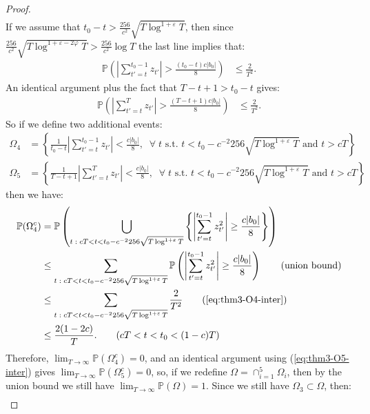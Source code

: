 \documentclass{article}
\newcommand{\sforall}{\;\forall\;}
\begin{document}
\begin{proof}
\begin{align*}
\end{align*}
If we assume that $t_0-t > \frac{256}{c^2}\sqrt{T\log^{1+\varepsilon}T}$, then since $\frac{256}{c^2}\sqrt{T\log^{1+\varepsilon-2\varphi}T} > \frac{256}{c^2}\log T$ the last line implies that:
\begin{align}
    \mathbb{P}\left(\left|\sum_{t'=t}^{t_0-1} z_{t'}\right| > \frac{(t_0-t) c|b_0|}{8}\right) &\leq \frac{2}{T^2}. \label{eq:thm3-O4-inter}
\end{align}
An identical argument plus the fact that $T - t + 1 > t_0 - t$ gives:
\begin{align}
    \mathbb{P}\left(\left|\sum_{t'=t}^T z_{t'}\right| > \frac{(T-t + 1) c|b_0|}{8}\right) &\leq \frac{2}{T^2}. \label{eq:thm3-O5-inter}
\end{align}
So if we define two additional events:
\begin{align*}
    \Omega_4 &= \left\{\frac{1}{t_0-t}\left|\sum_{t'=t}^{t_0-1} z_{t'}\right| < \frac{c|b_0|}{8}, \; \sforall t \text{ s.t. } t < t_0 - c^{-2}256\sqrt{T\log^{1+\varepsilon}T} \text{ and } t > cT\right\}\\
    \Omega_5 &= \left\{\frac{1}{T-t+1}\left|\sum_{t'=t}^T z_{t'}\right| < \frac{c|b_0|}{8}, \; \sforall t \text{ s.t. } t < t_0 - c^{-2}256\sqrt{T\log^{1+\varepsilon}T} \text{ and } t > cT\right\}
\end{align*}
then we have:
\begin{align*}
    \mathbb{P}(\Omega^c_4) &= \mathbb{P}\left(\bigcup_{t\;:\; cT < t < t_0 - c^{-2}256\sqrt{T\log^{1+\varepsilon}T}} \left\{\left|\sum_{t'=t}^{t_0-1} z^2_{t'}\right| \geq \frac{c|b_0|}{8}\right\}\right) \\
    &\leq \sum_{t\;:\; cT < t < t_0 - c^{-2}256\sqrt{T\log^{1+\varepsilon}T}} \mathbb{P}\left(\left|\sum_{t'=t}^{t_0-1} z^2_{t'}\right| \geq \frac{c|b_0|}{8}\right) \tag{union bound}\\
    &\leq \sum_{t\;:\; cT < t < t_0 - c^{-2}256\sqrt{T\log^{1+\varepsilon}T}} \frac{2}{T^2} \tag{\ref{eq:thm3-O4-inter}} \\
    &\leq \frac{2(1-2c)}{T}. \tag{$cT < t < t_0 < (1-c)T$}
\end{align*}
Therefore, $\lim_{T\to \infty} \mathbb{P}(\Omega^c_4) = 0$, and an identical argument using (\ref{eq:thm3-O5-inter}) gives $\lim_{T\to \infty} \mathbb{P}(\Omega^c_5) = 0$, so, if we redefine $\Omega = \cap_{i=1}^5 \Omega_i$, then by the union bound we still have $\lim_{T \to \infty} \mathbb{P}(\Omega) = 1$. Since we still have $\Omega_3 \subset \Omega$, then: 
\begin{align*}

\end{align*}
\end{proof}
\end{document}
